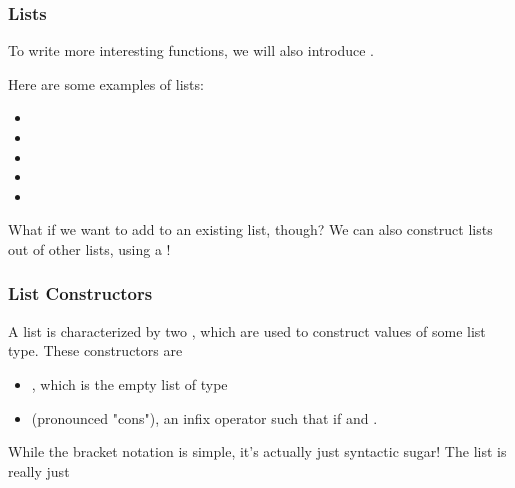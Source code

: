 \documentclass[aspectratio=169]{beamer}
\begin{document}
\begin{frame}[fragile]
  \frametitle{Lists}

  To write more interesting functions, we will also introduce .

  \pause
  \vspace{\fill}


  \pause
  \vspace{\fill}

  Here are some examples of lists:
  \begin{itemize}
    \item {}
    \item {}
    \item {}
    \item {}
    \item {}
  \end{itemize}

  \pause
  \vspace{\fill}
  
  What if we want to add to an existing list, though? We can also construct lists out of other lists, using a !
\end{frame}

\begin{frame}[fragile]
  \frametitle{List Constructors}

  A list is characterized by two , which are used to construct
  values of some list type. These constructors are 
  \pause
  \begin{itemize}
    \item \code{[]}\footnotemark, which is the empty list of type  \pause
    \item \code{::} (pronounced "cons"), an infix operator such that 
     if  and .
  \end{itemize}

  \pause
  \vspace{\fill}

  While the bracket notation is simple, it's actually just syntactic sugar! The 
  list \code{[1, 2, 3]} is really just 

  \pause
  \vspace{\fill}



  \tgs
\end{frame}
\end{document}
